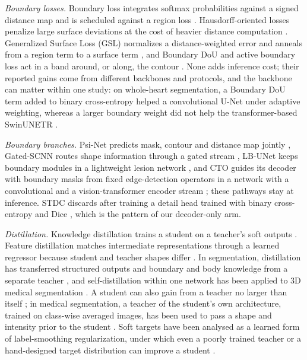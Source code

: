 \documentclass[fleqn,10pt,lineno]{wlpeerj}
\begin{document}
\emph{Boundary losses.} Boundary loss integrates softmax probabilities against a signed distance map and is scheduled against a region loss \citep{Kervadec2019Boundary}. Hausdorff-oriented losses penalize large surface deviations at the cost of heavier distance computation \citep{Karimi2020Reducing}. Generalized Surface Loss (GSL) normalizes a distance-weighted error and anneals from a region term to a surface term \citep{Celaya2024A}, and Boundary DoU and active boundary loss act in a band around, or along, the contour \citep{Sun2023Boundary, Wang2022Active}. None adds inference cost; their reported gains come from different backbones and protocols, and the backbone can matter within one study: on whole-heart segmentation, a Boundary DoU term added to binary cross-entropy helped a convolutional U-Net under adaptive weighting, whereas a larger boundary weight did not help the transformer-based SwinUNETR \citep{Sutassananon2025Adaptive}.

\emph{Boundary branches.} Psi-Net predicts mask, contour and distance map jointly \citep{Murugesan2019PsiNet}, Gated-SCNN routes shape information through a gated stream \citep{Takikawa2019GatedSCNN}, LB-UNet keeps boundary modules in a lightweight lesion network \citep{Xu2024LBUNet}, and CTO guides its decoder with boundary masks from fixed edge-detection operators in a network with a convolutional and a vision-transformer encoder stream \citep{Lin2025Rethinking}; these pathways stay at inference. STDC discards after training a detail head trained with binary cross-entropy and Dice \citep{Fan2021STDC}, which is the pattern of our decoder-only arm.

\emph{Distillation.} Knowledge distillation trains a student on a teacher's soft outputs \citep{Hinton2015Distilling}. Feature distillation matches intermediate representations through a learned regressor because student and teacher shapes differ \citep{Romero2015FitNets}. In segmentation, distillation has transferred structured outputs \citep{Liu2019Structured} and boundary and body knowledge from a separate teacher \citep{Liu2024BPKD}, and self-distillation within one network has been applied to 3D medical segmentation \citep{Wang2023MISSU, Banerjee2024Dual}. A student can also gain from a teacher no larger than itself \citep{Furlanello2018Born}; in medical segmentation, a teacher of the student's own architecture, trained on class-wise averaged images, has been used to pass a shape and intensity prior to the student \citep{Dong2025Shape}. Soft targets have been analysed as a learned form of label-smoothing regularization, under which even a poorly trained teacher or a hand-designed target distribution can improve a student \citep{Yuan2020Revisiting}.
\end{document}
